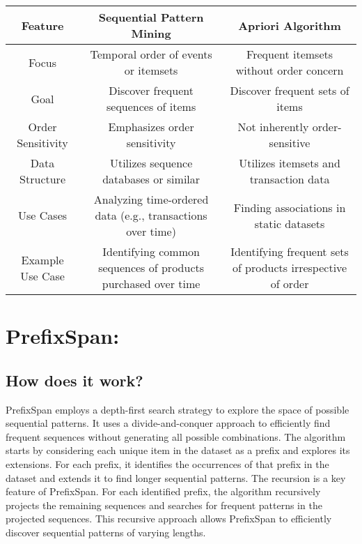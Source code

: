 \begin{table}[htbp]
    \centering
    \begin{adjustbox}{max width=\textwidth}
        \begin{tabular}{|>{\columncolor{green!50}}c|c|c|}
            \hline
            \rowcolor{green!70}
            \textbf{Feature} & \textbf{Sequential Pattern Mining} & \textbf{Apriori Algorithm} \\
            \hline
            Focus & Temporal order of events or itemsets & Frequent itemsets without order concern \\
            Goal & Discover frequent sequences of items & Discover frequent sets of items \\
            Order Sensitivity & Emphasizes order sensitivity & Not inherently order-sensitive \\
            Data Structure & Utilizes sequence databases or similar & Utilizes itemsets and transaction data \\
            Use Cases & Analyzing time-ordered data (e.g., transactions over time) & Finding associations in static datasets \\
            Example Use Case & Identifying common sequences of products purchased over time & Identifying frequent sets of products irrespective of order\\
            \hline
        \end{tabular}
    \end{adjustbox}
    \label{tab:sequential_apriori_comparison}
\end{table}

\section{PrefixSpan:}

\subsection{How does it work?}
PrefixSpan employs a depth-first search strategy to explore the space of possible sequential patterns. It uses a divide-and-conquer approach to efficiently find frequent sequences without generating all possible combinations.
\newline 
\newline
The algorithm starts by considering each unique item in the dataset as a prefix and explores its extensions. For each prefix, it identifies the occurrences of that prefix in the dataset and extends it to find longer sequential patterns.
\newline
\newline
The recursion is a key feature of PrefixSpan. For each identified prefix, the algorithm recursively projects the remaining sequences and searches for frequent patterns in the projected sequences. This recursive approach allows PrefixSpan to efficiently discover sequential patterns of varying lengths.


